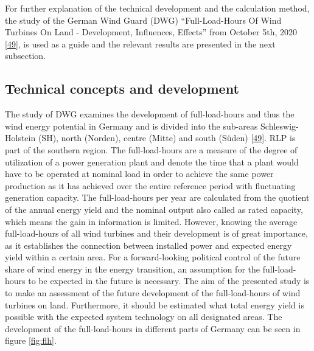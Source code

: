 \documentclass[a4paper,11pt]{article}
\begin{document}
For further explanation of the technical development and the calculation method, the study of the German Wind Guard (DWG) ``Full-Load-Hours Of Wind Turbines On Land - Development, Influences, Effects'' from October 5th, 2020 {[}\protect\hyperlink{ref-RasmusBorrmannDr.KnudRehfeldtDr.DennisKruse.2020}{49}{]}, is used as a guide and the relevant results are presented in the next subsection.

\hypertarget{technical-concepts-and-development}{%
\subsection{Technical concepts and development}\label{technical-concepts-and-development}}

The study of DWG examines the development of full-load-hours and thus the wind energy potential in Germany and is divided into the sub-areas Schleswig-Holstein (SH), north (Norden), centre (Mitte) and south (Süden) {[}\protect\hyperlink{ref-RasmusBorrmannDr.KnudRehfeldtDr.DennisKruse.2020}{49}{]}. RLP is part of the southern region. The full-load-hours are a measure of the degree of utilization of a power generation plant and denote the time that a plant would have to be operated at nominal load in order to achieve the same power production as it has achieved over the entire reference period with fluctuating generation capacity. The full-load-hours per year are calculated from the quotient of the annual energy yield and the nominal output also called as rated capacity, which means the gain in information is limited. However, knowing the average full-load-hours of all wind turbines and their development is of great importance, as it establishes the connection between installed power and expected energy yield within a certain area. For a forward-looking political control of the future share of wind energy in the energy transition, an assumption for the full-load-hours to be expected in the future is necessary. The aim of the presented study is to make an assessment of the future development of the full-load-hours of wind turbines on land. Furthermore, it should be estimated what total energy yield is possible with the expected system technology on all designated areas. The development of the full-load-hours in different parts of Germany can be seen in figure \ref{fig:flh}.
\end{document}
